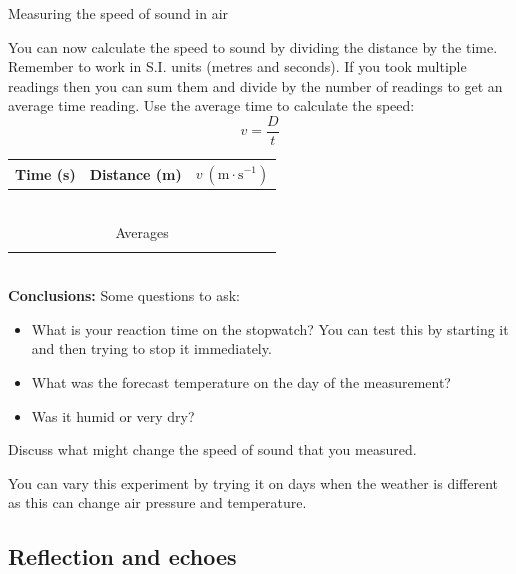 \begin{i_experiment}{\Large{Measuring the speed of sound in air}}
\begin{minipage}{.45\textwidth}
You can now calculate the speed to sound by dividing the distance by the time. Remember to work in S.I. units (metres and seconds). If you took multiple readings then you can sum them and divide by the number of readings to get an average time reading. Use the average time to calculate the speed:
\begin{equation*}
 v = \frac{D}{t}
\end{equation*} 
\end{minipage}\hspace{.03\textwidth}
\begin{minipage}{.5\textwidth}
\begin{table}[H]
 \begin{tabular}{|c|c|c|}\hline\hline
Time (s) & Distance (m) & $v~(\text{m}\cdot\text{s}^{-1})$ \\\hline
 & & \\\hline 
 & & \\\hline 
 & & \\\hline 
 & & \\\hline 
 & & \\\hline 
 & & \\\hline \hline
\multicolumn{3}{|c|}{Averages} \\ \hline
 & & \\\hline 
 \end{tabular}
\end{table}
\end{minipage}\\
\textbf{Conclusions:}
Some questions to ask:
\begin{itemize}
 \item What is your reaction time on the stopwatch? You can test this by starting it and then trying to stop it immediately.
 \item What was the forecast temperature on the day of the measurement?
 \item Was it humid or very dry?
\end{itemize}

Discuss what might change the speed of sound that you measured.

You can vary this experiment by trying it on days when the weather is different as this can change air pressure and temperature. \end{i_experiment}

\subsection{Reflection and echoes}

